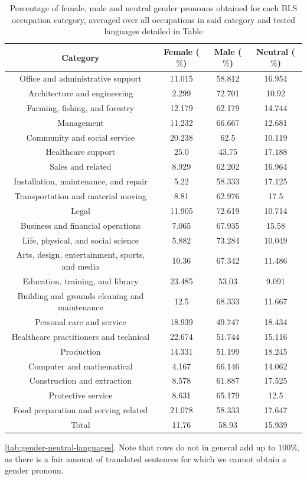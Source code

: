 \documentclass[twoside,11pt]{article}
\begin{document}
\begin{table}[H]
\footnotesize\setlength{\tabcolsep}{2.5pt}
\centering
\small{
	\begin{tabular}{|c|c|c|c|}
	\hline
	Category & Female ($\%$)	& Male ($\%$)	& Neutral ($\%$) \\ \hline
	\hline
	Office and administrative support & 11.015 & 58.812 & 16.954 \\ \hline
	Architecture and engineering & 2.299 & 72.701 & 10.92 \\ \hline
	Farming, fishing, and forestry & 12.179 & 62.179 & 14.744 \\ \hline
	Management & 11.232 & 66.667 & 12.681 \\ \hline
	Community and social service & 20.238 & 62.5 & 10.119 \\ \hline
	Healthcare support & 25.0 & 43.75 & 17.188 \\ \hline
	Sales and related & 8.929 & 62.202 & 16.964 \\ \hline
	Installation, maintenance, and repair & 5.22 & 58.333 & 17.125 \\ \hline
	Transportation and material moving & 8.81 & 62.976 & 17.5 \\ \hline
	Legal & 11.905 & 72.619 & 10.714 \\ \hline
	Business and financial operations & 7.065 & 67.935 & 15.58 \\ \hline
	Life, physical, and social science & 5.882 & 73.284 & 10.049 \\ \hline
	Arts, design, entertainment, sports, and media & 10.36 & 67.342 & 11.486 \\ \hline
	Education, training, and library & 23.485 & 53.03 & 9.091 \\ \hline
	Building and grounds cleaning and maintenance & 12.5 & 68.333 & 11.667 \\ \hline
	Personal care and service & 18.939 & 49.747 & 18.434 \\ \hline
	Healthcare practitioners and technical & 22.674 & 51.744 & 15.116 \\ \hline
	Production & 14.331 & 51.199 & 18.245 \\ \hline
	Computer and mathematical & 4.167 & 66.146 & 14.062 \\ \hline
	Construction and extraction & 8.578 & 61.887 & 17.525 \\ \hline
	Protective service & 8.631 & 65.179 & 12.5 \\ \hline
	Food preparation and serving related & 21.078 & 58.333 & 17.647 \\ \hline \hline
	Total & 11.76 & 58.93 & 15.939 \\ \hline
	\end{tabular}
	}
    \caption{Percentage of female, male and neutral gender pronouns obtained for each BLS occupation category, averaged over all occupations in said category and tested languages detailed in Table} \ref{tab:gender-neutral-languages}. Note that rows do not in general add up to $100\%$, as there is a fair amount of translated sentences for which we cannot obtain a gender pronoun.
	\label{tab:gender-by-category}
\end{table}
\end{document}
